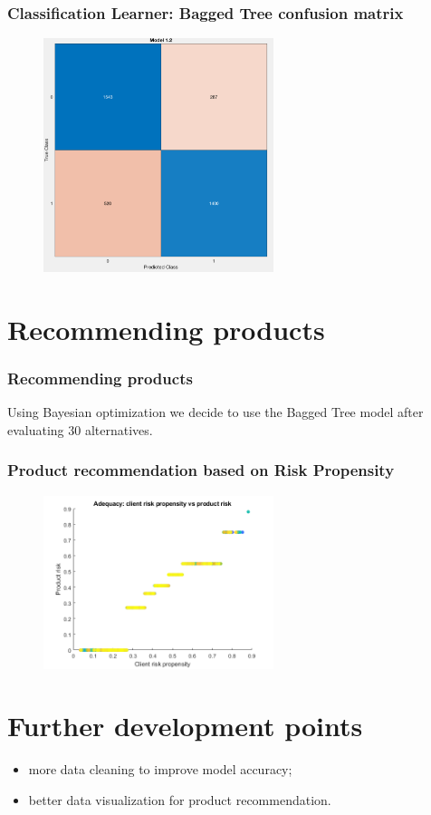 \documentclass{beamer}
\begin{document}
\begin{frame}
    \frametitle{Classification Learner: Bagged Tree confusion matrix}
    \begin{figure}
    	\centering
    	\includegraphics[width=0.6\textwidth]{cl_2_confusion}
    \end{figure}
\end{frame}

\section{Recommending products}

\begin{frame}
\frametitle{Recommending products}
Using Bayesian optimization we decide to use the Bagged Tree model after evaluating 30 alternatives.
\end{frame}

\begin{frame}
    \frametitle{Product recommendation based on Risk Propensity}
    \begin{figure}
    	\centering
    	\includegraphics[width=0.6\textwidth]{recomm1}
    \end{figure}
\end{frame}

\section{Further development points}

\begin{frame}
    \begin{itemize}
        \item more data cleaning to improve model accuracy;
        \item better data visualization for product recommendation.
    \end{itemize}
\end{frame}
\end{document}
